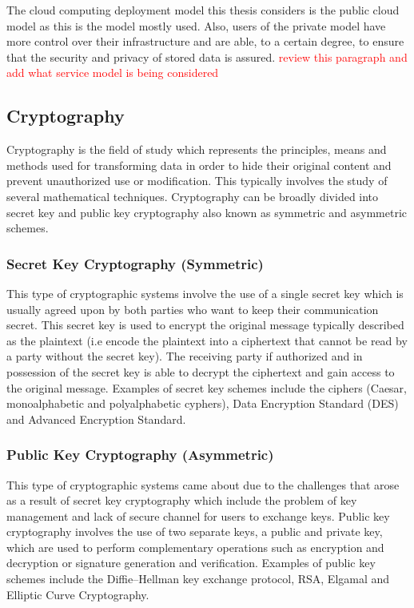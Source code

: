 The cloud computing deployment model this thesis considers is the public cloud model as this is the model mostly used. Also, users of the private model have more control over their infrastructure and are able, to a certain degree, to ensure that the security and privacy of stored data is assured. \textcolor{red}{review this paragraph and add what service model is being considered}


\subsection{Cryptography}

Cryptography\cite{Kissel2013} is the field of study which represents the principles, means and methods used for transforming data in order to hide their original content and prevent unauthorized use or modification. This typically involves the study of several mathematical techniques. Cryptography can be broadly divided into secret key and public key cryptography also known as symmetric and asymmetric schemes.

\subsubsection*{Secret Key Cryptography (Symmetric)} This type of cryptographic systems involve the use of a single secret key which is usually agreed upon by both parties who want to keep their communication secret. This secret key is used to encrypt the original message typically described as the plaintext (i.e encode the plaintext into a ciphertext that cannot be read by a party without the secret key). The receiving party if authorized and in possession of the secret key is able to decrypt the ciphertext and gain access to the original message. Examples of secret key schemes include the ciphers (Caesar, monoalphabetic and polyalphabetic cyphers), Data Encryption Standard (DES) and Advanced Encryption Standard. 

\subsubsection*{Public Key Cryptography (Asymmetric)} This type of cryptographic systems came about due to the challenges that arose as a result of secret key cryptography which include the problem of key management and lack of secure channel for users to exchange keys. Public key cryptography involves the use of two separate keys, a public and private key, which are used to perform complementary operations such as encryption and decryption or signature generation and verification. Examples of public key schemes include the Diffie–Hellman key exchange protocol, RSA, Elgamal and Elliptic Curve Cryptography.

